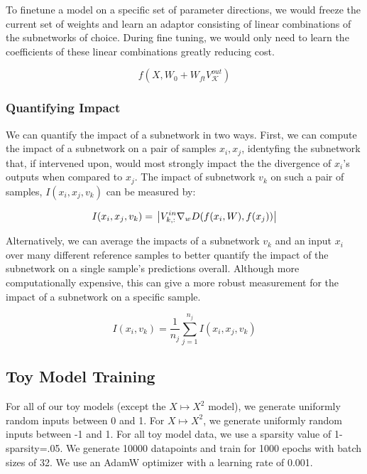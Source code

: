 \documentclass{article}
\theoremstyle{plain}
\theoremstyle{definition}
\theoremstyle{remark}
\begin{document}
To finetune a model on a specific set of parameter directions, we would freeze the current set of weights and learn an adaptor consisting of linear combinations of the subnetworks of choice. During fine tuning, we would only need to learn the coefficients of these linear combinations greatly reducing cost.

\begin{equation}
    f(X, W_0 + W_{ft} V^{out}_\mathcal{K})
\end{equation}

\subsubsection{Quantifying Impact}\label{sec:impact}

We can quantify the impact of a subnetwork in two ways. First, we can compute the impact of a subnetwork on a pair of samples $x_i, x_j$, identyfing the subnetwork that, if intervened upon, would most strongly impact the the divergence of $x_i$'s outputs when compared to $x_j$. The impact of subnetwork $v_k$ on such a pair of samples, $I(x_i, x_j, v_k)$ can be measured by:

\begin{equation}
    I(x_i, x_j, v_k) = \\
    \left| V^{in}_{k,:} \nabla_w D(f(x_i, W), f(x_j)) \right|
\end{equation}

Alternatively, we can average the impacts of a subnetwork $v_k$ and an input $x_i$ over many different reference samples to better quantify the impact of the subnetwork on a single sample's predictions overall. Although more computationally expensive, this can give a more robust measurement for the impact of a subnetwork on a specific sample. 

\begin{equation}
    I(x_i, v_k) = \frac{1}{n_j} \sum_{j=1}^{n_j} I(x_i, x_j, v_k)
\end{equation}


\subsection{Toy Model Training}\label{sec:toymodel_hyperparams}

For all of our toy models (except the $X \mapsto X^2$ model), we generate uniformly random inputs between 0 and 1. For $X \mapsto X^2$, we generate uniformly random inputs between -1 and 1. For all toy model data, we use a sparsity value of 1-sparsity=.05. We generate 10000 datapoints and train for 1000 epochs with batch sizes of 32. We use an AdamW optimizer with a learning rate of 0.001. 
\end{document}

